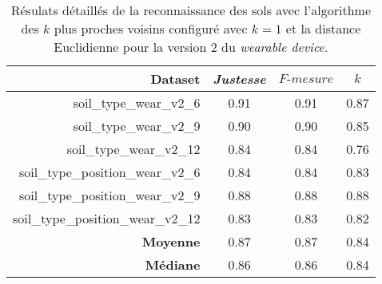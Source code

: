\begin{table}[H]\renewcommand{\arraystretch}{0.5}
	\centering
	\caption{Résulats détaillés de la reconnaissance des sols avec l'algorithme des $k$ plus proches voisins configuré avec $k=1$ et la distance Euclidienne pour la version 2 du \textit{wearable device}.}
	\label{tab:tab:knn-dE-wear-v2}
	\begin{tabular}{@{}rccc@{}}
		\toprule
			\textbf{Dataset} & \textit{Justesse} & $F\mbox{-} mesure$ & \textbf{$k$} \\
		\midrule
			soil\_type\_wear\_v2\_6 & 0.91 & 0.91 & 0.87 \\
			soil\_type\_wear\_v2\_9 & 0.90 & 0.90 & 0.85 \\
			soil\_type\_wear\_v2\_12 & 0.84 & 0.84 & 0.76 \\
			soil\_type\_position\_wear\_v2\_6 & 0.84 & 0.84 & 0.83 \\
			soil\_type\_position\_wear\_v2\_9 & 0.88 & 0.88 & 0.88 \\
			soil\_type\_position\_wear\_v2\_12 & 0.83 & 0.83 & 0.82 \\
			\textbf{Moyenne} & 0.87 & 0.87 & 0.84 \\
			\textbf{Médiane} & 0.86 & 0.86 & 0.84 \\
		\bottomrule
	\end{tabular}
\end{table}

